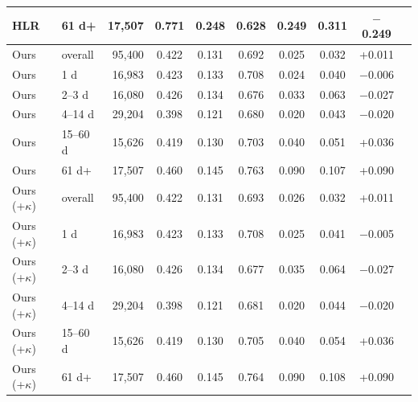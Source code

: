 \begin{table}[htbp]
\begin{tabular}{@{}llrccccccc@{}}
    HLR & 61 d+ & 17,507 & 0.771 & 0.248 & 0.628 & 0.249 & 0.311 & $-$0.249 \\
    \midrule
    Ours & overall & 95,400 & 0.422 & 0.131 & 0.692 & 0.025 & 0.032 & +0.011 \\
    Ours & 1 d & 16,983 & 0.423 & 0.133 & 0.708 & 0.024 & 0.040 & $-$0.006 \\
    Ours & 2--3 d & 16,080 & 0.426 & 0.134 & 0.676 & 0.033 & 0.063 & $-$0.027 \\
    Ours & 4--14 d & 29,204 & 0.398 & 0.121 & 0.680 & 0.020 & 0.043 & $-$0.020 \\
    Ours & 15--60 d & 15,626 & 0.419 & 0.130 & 0.703 & 0.040 & 0.051 & +0.036 \\
    Ours & 61 d+ & 17,507 & 0.460 & 0.145 & 0.763 & 0.090 & 0.107 & +0.090 \\
    \midrule
    Ours (+$\kappa$) & overall & 95,400 & 0.422 & 0.131 & 0.693 & 0.026 & 0.032 & +0.011 \\
    Ours (+$\kappa$) & 1 d & 16,983 & 0.423 & 0.133 & 0.708 & 0.025 & 0.041 & $-$0.005 \\
    Ours (+$\kappa$) & 2--3 d & 16,080 & 0.426 & 0.134 & 0.677 & 0.035 & 0.064 & $-$0.027 \\
    Ours (+$\kappa$) & 4--14 d & 29,204 & 0.398 & 0.121 & 0.681 & 0.020 & 0.044 & $-$0.020 \\
    Ours (+$\kappa$) & 15--60 d & 15,626 & 0.419 & 0.130 & 0.705 & 0.040 & 0.054 & +0.036 \\
    Ours (+$\kappa$) & 61 d+ & 17,507 & 0.460 & 0.145 & 0.764 & 0.090 & 0.108 & +0.090 \\
    \bottomrule
  \end{tabular}
\end{table}

